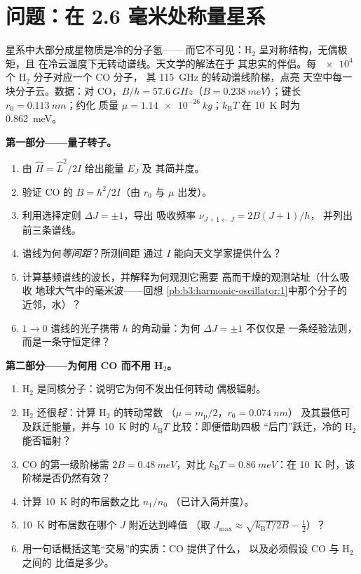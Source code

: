 \section{问题：在 2.6 毫米处称量星系}

\begin{problem}\label{pb:b3:quantum-angular-momentum:1}
星系中大部分成星物质是冷的分子氢——
而它不可见：H$_2$ 呈对称结构，无偶极矩，且
在冷云温度下无转动谱线。天文学的解法在于
其忠实的伴侣。每 $\num{e4}$ 个 H$_2$ 分子对应一个 CO 分子，
其 \qty{115}{GHz} 的转动谱线阶梯，点亮
天空中每一块分子云。数据：对 CO，$B/h = \qty{57.6}{GHz}$（$B =
\qty{0.238}{meV}$）；键长 $r_0 = \qty{0.113}{nm}$；约化
质量 $\mu = \qty{1.14e-26}{kg}$；$k_{\text{B}}T$ 在 \qty{10}{K} 时为
\qty{0.862}{meV}。

\medskip\noindent\textbf{第一部分——量子转子。}
\begin{enumerate}
  \item 由 $\hat H = \hat L^2/2I$ 给出能量 $E_J$ 及
        其简并度。
  \item 验证 CO 的 $B = \hbar^2/2I$（由 $r_0$ 与 $\mu$ 出发）。
  \item 利用选择定则 $\Delta J = \pm1$，导出
        吸收频率 $\nu_{J+1\leftarrow J} = 2B(J+1)/h$，
        并列出前三条谱线。
  \item 谱线为何\emph{等间距}？所测间距
        通过 $I$ 能向天文学家提供什么？
  \item 计算基频谱线的波长，并解释为何观测它需要
        高而干燥的观测站址（什么吸收
        地球大气中的毫米波——回想
        \cref{pb:b3:harmonic-oscillator:1}中那个分子的
        近邻，水）？
  \item $1 \to 0$ 谱线的光子携带
        $\hbar$ 的角动量：为何 $\Delta J = \pm1$ 不仅仅是
        一条经验法则，而是一条守恒定律？
\end{enumerate}

\medskip\noindent\textbf{第二部分——为何用 CO 而不用 H$_2$。}
\begin{enumerate}[resume]
  \item H$_2$ 是同核分子：说明它为何不发出任何转动
        偶极辐射。
  \item H$_2$ 还很\emph{轻}：计算 H$_2$ 的转动常数
        （$\mu = m_{\text{p}}/2$，$r_0 = \qty{0.074}{nm}$）
        及其最低可及跃迁能量，并与
        \qty{10}{K} 时的 $k_{\text{B}}T$ 比较：即便借助四极
        “后门”跃迁，冷的 H$_2$ 能否辐射？
  \item CO 的第一级阶梯需 $2B = \qty{0.48}{meV}$，对比
        $k_{\text{B}}T = \qty{0.86}{meV}$：在
        \qty{10}{K} 时，该阶梯是否仍然有效？
  \item 计算 \qty{10}{K} 时的布居数之比 $n_1/n_0$
        （已计入简并度）。
  \item \qty{10}{K} 时布居数在哪个 $J$ 附近达到峰值
        （取 $J_{\max} \approx \sqrt{k_{\text{B}}T/2B} - \tfrac12$）？
  \item 用一句话概括这笔“交易”的实质：CO 提供了什么，
        以及必须假设 CO 与 H$_2$ 之间的
        比值是多少。
\end{enumerate}


\end{problem}
